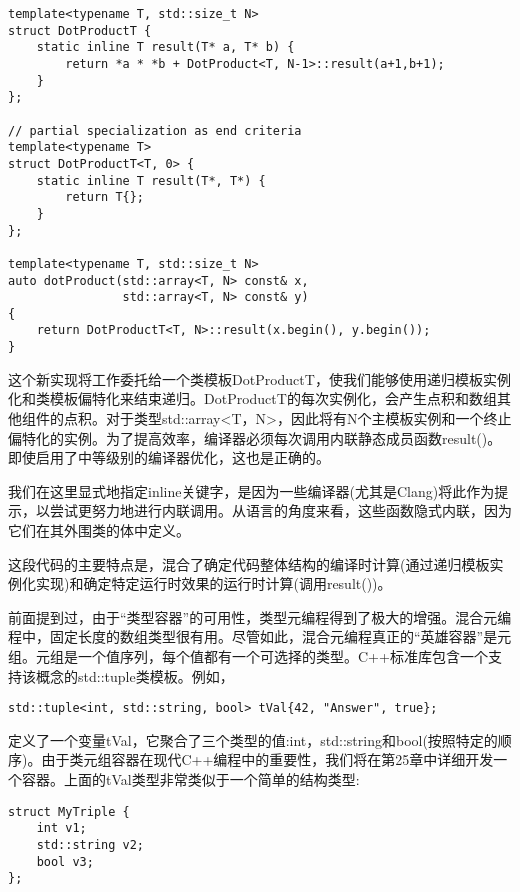 \begin{lstlisting}[style=styleCXX]
template<typename T, std::size_t N>
struct DotProductT {
	static inline T result(T* a, T* b) {
		return *a * *b + DotProduct<T, N-1>::result(a+1,b+1);
	}
};

// partial specialization as end criteria
template<typename T>
struct DotProductT<T, 0> {
	static inline T result(T*, T*) {
		return T{};
	}
};

template<typename T, std::size_t N>
auto dotProduct(std::array<T, N> const& x,
				std::array<T, N> const& y)
{
	return DotProductT<T, N>::result(x.begin(), y.begin());
}
\end{lstlisting}

这个新实现将工作委托给一个类模板DotProductT，使我们能够使用递归模板实例化和类模板偏特化来结束递归。DotProductT的每次实例化，会产生点积和数组其他组件的点积。对于类型std::array<T，N>，因此将有N个主模板实例和一个终止偏特化的实例。为了提高效率，编译器必须每次调用内联静态成员函数result()。即使启用了中等级别的编译器优化，这也是正确的。

\begin{tcolorbox}[colback=webgreen!5!white,colframe=webgreen!75!black]
\hspace*{0.75cm}我们在这里显式地指定inline关键字，是因为一些编译器(尤其是Clang)将此作为提示，以尝试更努力地进行内联调用。从语言的角度来看，这些函数隐式内联，因为它们在其外围类的体中定义。
\end{tcolorbox}

这段代码的主要特点是，混合了确定代码整体结构的编译时计算(通过递归模板实例化实现)和确定特定运行时效果的运行时计算(调用result())。

前面提到过，由于“类型容器”的可用性，类型元编程得到了极大的增强。混合元编程中，固定长度的数组类型很有用。尽管如此，混合元编程真正的“英雄容器”是元组。元组是一个值序列，每个值都有一个可选择的类型。C++标准库包含一个支持该概念的std::tuple类模板。例如，

\begin{lstlisting}[style=styleCXX]
std::tuple<int, std::string, bool> tVal{42, "Answer", true};
\end{lstlisting}

定义了一个变量tVal，它聚合了三个类型的值:int，std::string和bool(按照特定的顺序)。由于类元组容器在现代C++编程中的重要性，我们将在第25章中详细开发一个容器。上面的tVal类型非常类似于一个简单的结构类型:

\begin{lstlisting}[style=styleCXX]
struct MyTriple {
	int v1;
	std::string v2;
	bool v3;
};
\end{lstlisting}


